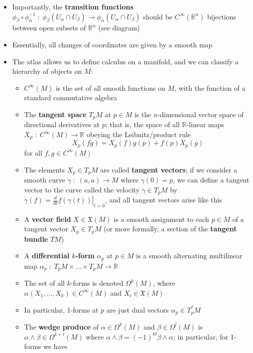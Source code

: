 \documentclass[12pt,a4paper]{article}
\numberwithin{equation}{section}
\begin{document}
\begin{itemize}
		\item Importantly, the \textbf{transition functions} $\phi_{\beta}\circ\phi_{\alpha}^{-1}\;:\;\phi_{\beta}(U_{\alpha}\cap U_{\beta})\to\phi_{\alpha}(U_{\alpha}\cap U_{\beta})$ should be $C^{\infty}(\mathbb{R}^{n})$ bijections between open subsets of $\mathbb{R}^{n}$ (see diagram)
		\item Essentially, all changes of coordinates are given by a smooth map
		\item The atlas allows us to define calculus on a manifold, and we can classify a hierarchy of objects on $M$:
		\begin{itemize}
			\item $C^{\infty}(M)$ is the set of all smooth functions on $M$, with the function of a standard commutative algebra
			\item The \textbf{tangent space} $T_{p}M$ at $p\in M$ is the $n$-dimensional vector space of directional derivatives at $p$; that is, the space of all $\mathbb{R}$-linear maps $X_{p}\;:\; C^{\infty}(M)\to\mathbb{R}$ obeying the Leibnitz/product rule
			\begin{equation}
				X_{p}(fg)=X_{p}(f)g(p)+f(p)X_{p}(g)
			\end{equation}
			for all $f,g\in C^{\infty}(M)$
			\item The elements $X_{p}\in T_{p}M$ are called \textbf{tangent vectors}; if we consider a smooth curve $\gamma\;:\;(a,a)\to M$ where $\gamma(0)=p$, we can define a tangent vector to the curve called the velocity $\dot{\gamma}\in T_{p}M$ by $\dot{\gamma}(f)=\left.\frac{d}{dt}f(\gamma(t))\right|_{t=0}$, and all tangent vectors arise like this
			\item A \textbf{vector field} $X\in\mathfrak{X}(M)$ is a smooth assignment to each $p\in M$ of a tangent vector $X_{p}\in T_{p}M$ (or more formally, a section of the \textbf{tangent bundle} $TM$)
			\item A \textbf{differential} $k$\textbf{-form} $\alpha_{p}$ at $p\in M$ is a smooth alternating multilinear map $\alpha_{p}\;:\;T_{p}M\times\ldots\times T_{p}M\to \mathbb{R}$
			\item The set of all $k$-forms is denoted $\Omega^{k}(M)$, where $\alpha(X_{1},\ldots,X_{k})\in C^{\infty}(M)$ and $X_{i}\in\mathfrak{X}(M)$
			\item In particular, 1-forms at $p$ are just dual vectors $\alpha_{p}\in T_{p}^{*}M$
			\item The \textbf{wedge produce} of $\alpha\in\Omega^{k}(M)$ and $\beta\in\Omega^{l}(M)$ is $\alpha\wedge\beta\in\Omega^{k+l}(M)$ where $\alpha\wedge\beta=(-1)^{kl}\beta\wedge\alpha$; in particular, for 1-forms we have

\end{itemize}
\end{itemize}
\end{document}

